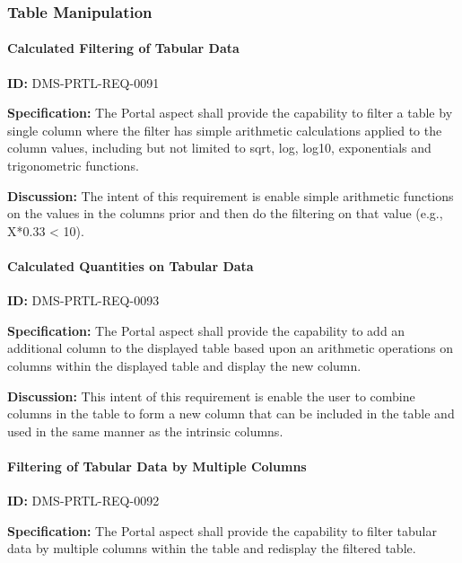 \documentclass[SE,toc,lsstdraft]{lsstdoc}
\begin{document}
\subsubsection{Table Manipulation}

\paragraph{Calculated Filtering of Tabular Data}\hfill  %

\label{DMS-PRTL-REQ-0091}
\textbf{ID:} DMS-PRTL-REQ-0091

\textbf{Specification:}
The Portal aspect shall provide the capability to filter a table by single column where the filter has simple arithmetic calculations applied to the column values, including but not limited to sqrt, log, log10, exponentials and trigonometric functions.

\textbf{Discussion:}
The intent of this requirement is enable simple arithmetic functions on the values in the columns prior and then do the filtering on that value (e.g., X*0.33 < 10).

\paragraph{Calculated Quantities on Tabular Data}\hfill  %

\label{DMS-PRTL-REQ-0093}
\textbf{ID:} DMS-PRTL-REQ-0093

\textbf{Specification:}
The Portal aspect shall provide the capability to add an additional column to the displayed table based upon an arithmetic operations on columns within the displayed table and display the new column.

\textbf{Discussion:}
This intent of this requirement is enable the user to combine columns in the table to form a new column that can be included in the table and used in the same manner as the intrinsic columns.

\paragraph{Filtering of Tabular Data by Multiple Columns}\hfill  %

\label{DMS-PRTL-REQ-0092}
\textbf{ID:} DMS-PRTL-REQ-0092

\textbf{Specification:}
The Portal aspect shall provide the capability to filter tabular data by multiple columns within the table and redisplay the filtered table.
\end{document}
